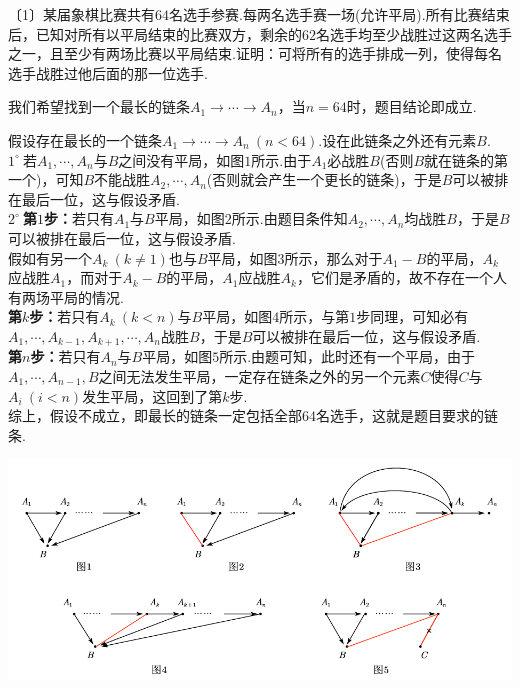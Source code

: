 \documentclass[lang=cn, zihao=4.5]{elegantbook}
\newcommand{\nd}[1]{〔#1〕}
\newcommand{\buzhou}[1]{$#1^{\circ} \ $}
\begin{document}
\begin{example} %
	\nd{1}某届象棋比赛共有$64$名选手参赛.每两名选手赛一场(允许平局).所有比赛结束后，已知对所有以平局结束的比赛双方，剩余的$62$名选手均至少战胜过这两名选手之一，且至少有两场比赛以平局结束.证明：可将所有的选手排成一列，使得每名选手战胜过他后面的那一位选手.
\end{example}
\begin{solution}
	\begin{guess}
		我们希望找到一个最长的链条$A_1 \to \cdots \to A_n$，当$n=64$时，题目结论即成立.
	\end{guess}
	假设存在最长的一个链条$A_1 \to \cdots \to A_n~(n < 64)$.设在此链条之外还有元素$B$. \\
	\buzhou{1}若$A_1, \cdots ,A_n$与$B$之间没有平局，如图$1$所示.由于$A_1$必战胜$B$(否则$B$就在链条的第一个)，可知$B$不能战胜$A_2, \cdots ,A_n$(否则就会产生一个更长的链条)，于是$B$可以被排在最后一位，这与假设矛盾. \\
	\buzhou{2}\textbf{第$1$步：}若只有$A_1$与$B$平局，如图$2$所示.由题目条件知$A_2, \cdots ,A_n$均战胜$B$，于是$B$可以被排在最后一位，这与假设矛盾. \\
	假如有另一个$A_k~(k \neq 1)$也与$B$平局，如图$3$所示，那么对于$A_1-B$的平局，$A_k$应战胜$A_1$，而对于$A_k-B$的平局，$A_1$应战胜$A_k$，它们是矛盾的，故不存在一个人有两场平局的情况. \\
	\textbf{第$k$步：}若只有$A_k~(k<n)$与$B$平局，如图$4$所示，与第$1$步同理，可知必有$A_1, \cdots ,A_{k-1},A_{k+1}, \cdots ,A_n$战胜$B$，于是$B$可以被排在最后一位，这与假设矛盾. \\
	\textbf{第$n$步：}若只有$A_n$与$B$平局，如图$5$所示.由题可知，此时还有一个平局，由于$A_1, \cdots ,A_{n-1},B$之间无法发生平局，一定存在链条之外的另一个元素$C$使得$C$与$A_i~(i<n)$发生平局，这回到了第$k$步. \\
	综上，假设不成立，即最长的链条一定包括全部$64$名选手，这就是题目要求的链条.
	\begin{center}
		\includegraphics[width=16cm]{attachment/202302074.pdf}
	\end{center}
\end{solution}
\end{document}

